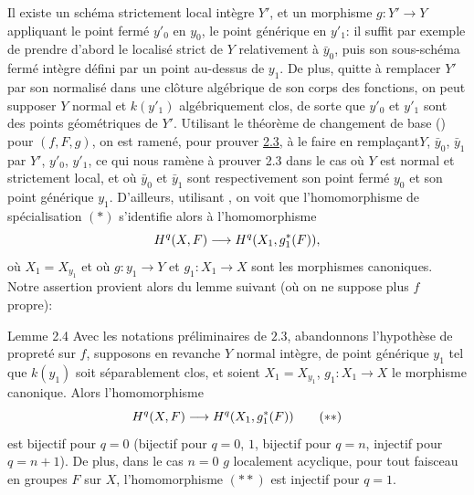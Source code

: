 \documentclass[10pt]{../fichiers-configuration-latex/smfart}
\begin{document}
Il existe un schéma strictement local intègre $Y'$, et un morphisme
$g:Y'\rightarrow Y$ appliquant le point fermé $y'_0$ en $y_{0}$, le point
générique en $y'_1$: il suffit par exemple de prendre d'abord le
localisé strict de $Y$ relativement à $\bar{y}_0$, puis son
sous-schéma fermé intègre défini par un point au-dessus de $y_1$. De
plus, quitte à remplacer $Y'$ par son normalisé dans une clôture
algébrique de son corps des fonctions, on peut supposer $Y$ normal et
$k(y'_1)$ algébriquement clos, de sorte que $y'_0$ et $y'_1$ sont des
points géométriques de $Y'$. Utilisant le théorème de changement de
base () pour $(f,F,g)$, on est ramené, pour prouver \hyperref[XVI.cor2.3]{2.3}, à le
faire en remplaçant\pageoriginale $Y$, $\bar{y}_0$, $\bar{y}_1$ par
$Y'$, $y'_0$, $y'_1$, ce qui nous ramène à prouver 2.3 dans le cas où
$Y$ est normal et strictement local, et où $\bar{y}_0$ et $\bar{y}_1$
sont respectivement son point fermé $y_0$ et son point générique
$y_1$. D'ailleurs, utilisant , on voit que l'homomorphisme de
spécialisation $(\ast)$ s'identifie alors à l'homomorphisme
$$
H^{q}(X,F)\longrightarrow H^{q}(X_1,g^{\ast}_1(F)){},
$$
où $X_1=X_{y_1}$ et où $g:y_1\rightarrow Y$ et $g_1:X_1\rightarrow X$
sont les morphismes canoniques. Notre assertion provient alors du
lemme suivant (où on ne suppose plus $f$ propre):

\begin{enonce*}{Lemme 2.4}
Avec les notations préliminaires de $2.3$, abandonnons l'hypothèse de
propreté sur $f$, supposons en revanche $Y$ normal intègre, de point
générique $y_1$ tel que $k(y_1)$ soit séparablement clos, et soient
$X_1=X_{y_1}$, $g_1:X_1\rightarrow X$ le morphisme canonique. Alors
l'homomorphisme
\begin{equation*}
H^{q}(X,F)\longrightarrow H^{q}(X_1,g^{\ast}_1(F))\tag{${\ast}{\ast}$}
\end{equation*}
est bijectif pour $q=0$ (\resp bijectif pour $q=0$, $1$, \resp
bijectif pour $q=n$, injectif pour $q=n+1$). De plus, dans le cas
$n=0$ \ie $g$ localement acyclique, pour tout faisceau en groupes $F$
sur $X$, l'homomorphisme $({\ast}{\ast})$ est injectif pour $q=1$.
\end{enonce*}
\end{document}
